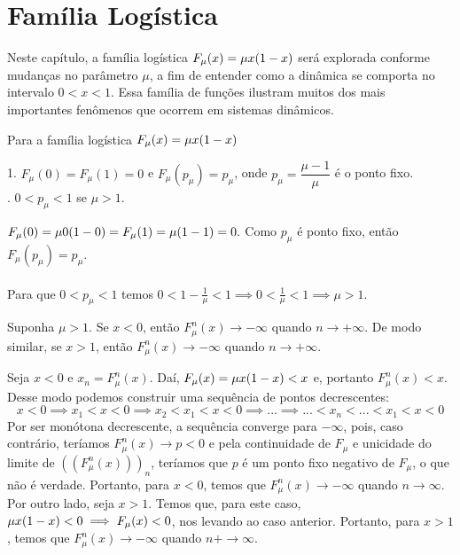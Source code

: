 \documentclass[../IC.tex]{subfiles}
\begin{document}
	\chapter {Família Logística}
	
	Neste capítulo, a família logística $F_\mu(x)=\mu\/x(1-x)$ será explorada conforme mudanças no parâmetro $\mu$, a fim de entender como a dinâmica se comporta no intervalo $0<x<1$. Essa família de funções ilustram muitos dos mais importantes fenômenos que ocorrem em sistemas dinâmicos.
	
	\begin{proposicao}
		Para a família logística $F_\mu(x)=\mu\/x(1-x)$
		
		1. $F_\mu(0) = F_\mu(1) = 0$ e $F_\mu(p_\mu) = p_\mu$, onde $p_\mu = \dfrac{\mu - 1}{\mu}$ é o ponto fixo. \\
		. $0<p_\mu<1$ se $\mu > 1$. 
	\end{proposicao}
	
	\begin{prova}
		$F_\mu(0) = \mu\/0(1-0) = F_\mu(1) = \mu\/(1-1) = 0.$ Como $p_\mu$ é ponto fixo, então $F_\mu(p_\mu) = p_\mu.$ \\\\
	    Para que $0<p_\mu<1$ temos $0<1-\frac{1}{\mu}<1 \implies 0<\frac{1}{\mu}<1 \implies \mu>1.$		
	\end{prova}
	
	\begin{proposicao}\label{proposicaoQueLevaParaMenosInfinito}
		Suponha $\mu > 1$. Se $x<0$, então $F_\mu^n(x) \rightarrow -\infty$ quando $n \rightarrow +\infty$. De modo similar, se $x>1$, então $F_\mu^n(x) \rightarrow -\infty$ quando $n \rightarrow +\infty$.
	\end{proposicao}
	
	\begin{prova}
		Seja $x<0$ e $x_n=F_\mu^n(x)$. Daí, $F_\mu(x)=\mu\/x(1-x)<x$ e, portanto $F_\mu^n(x) < x$. Desse modo podemos construir uma sequência de pontos decrescentes: 
		$$x < 0 \implies x_1 < x < 0 \implies x_2 < x_1 < x < 0 \implies ... \implies ...<x_n<...<x_1<x<0$$
		Por ser monótona decrescente, a sequência converge para $-\infty$, pois, caso contrário, teríamos $F_\mu^n(x) \to p <0$ e pela continuidade de $F_\mu$ e unicidade do limite de $((F_\mu^n(x)))_n$, teríamos que $p$ é um ponto fixo negativo de $F_\mu$, o que não é verdade. Portanto, para $x<0$, temos que $F_\mu^n(x) \rightarrow -\infty$ quando $n \rightarrow \infty$.
		\\
		 Por outro lado, seja $x>1$. Temos que, para este caso, $\mu\/x(1-x) < 0 \implies F_\mu(x) < 0$, nos levando ao caso anterior. Portanto, para $x>1$, temos que $F_\mu^n(x) \rightarrow -\infty$ quando $n +\rightarrow \infty$.
	\end{prova}
	
\end{document}
